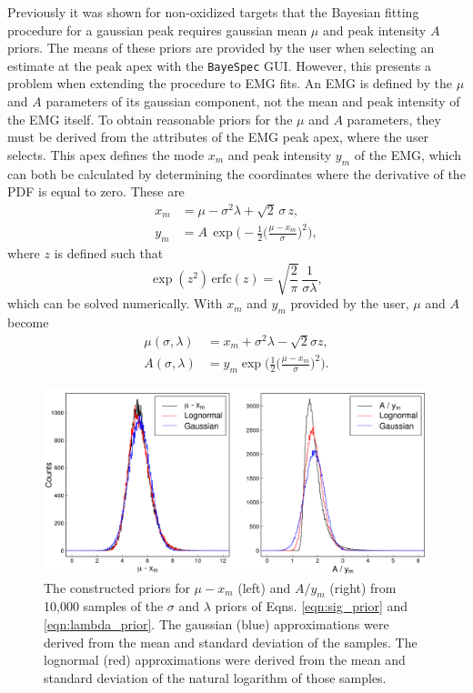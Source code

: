 Previously it was shown for non-oxidized targets that the Bayesian fitting procedure for a gaussian peak requires gaussian mean $\mu$ and peak intensity $A$ priors. The means of these priors are provided by the user when selecting an estimate at the peak apex with the \texttt{BayeSpec} GUI. However, this presents a problem when extending the procedure to EMG fits. An EMG is defined by the $\mu$ and $A$ parameters of its gaussian component, not the mean and peak intensity of the EMG itself. To obtain reasonable priors for the $\mu$ and $A$ parameters, they must be derived from the attributes of the EMG peak apex, where the user selects. This apex defines the mode $x_{m}$ and peak intensity $y_{m}$ of the EMG, which can both be calculated by determining the coordinates where the derivative of the PDF is equal to zero. These are
\begin{align}
    x_{m} &= \mu - \sigma^{2}\lambda + \sqrt{2} \, \sigma \, z, \nonumber \\
    y_{m} &= A \, \exp \Big( -\frac{1}{2} \Big( \frac{\mu - x_{m}}{\sigma} \Big)^{2} \Big), \label{eqn:mode_peak_intensity}
\end{align}
where $z$ is defined such that
\begin{equation}
    \exp(z^{2}) \, \mathrm{erfc}(z) = \sqrt{\frac{2}{\pi}} \, \frac{1}{\sigma\lambda},
\end{equation}
which can be solved numerically. With $x_{m}$ and $y_{m}$ provided by the user, $\mu$ and $A$ become
\begin{align}
    \mu(\sigma, \lambda) &= x_{m} + \sigma^{2} \lambda - \sqrt{2} \sigma z, \label{eqn:mu_before} \\
    A(\sigma, \lambda) &= y_{m} \exp \Big( \frac{1}{2} \Big( \frac{\mu-x_{m}}{\sigma} \Big)^{2} \Big). \label{eqn:A_before}
\end{align}
\begin{figure}[t]
    \centering
    \includegraphics[width=6.5in]{Chapter-6/figs/mu_and_A.png}
    \caption{\label{fig:mu_and_A}The constructed priors for $\mu - x_{m}$ (left) and $A/y_{m}$ (right) from 10,000 samples of the $\sigma$ and $\lambda$ priors of Eqns. \ref{eqn:sig_prior} and \ref{eqn:lambda_prior}. The gaussian (blue) approximations were derived from the mean and standard deviation of the samples. The lognormal (red) approximations were derived from the mean and standard deviation of the natural logarithm of those samples.}
\end{figure}
